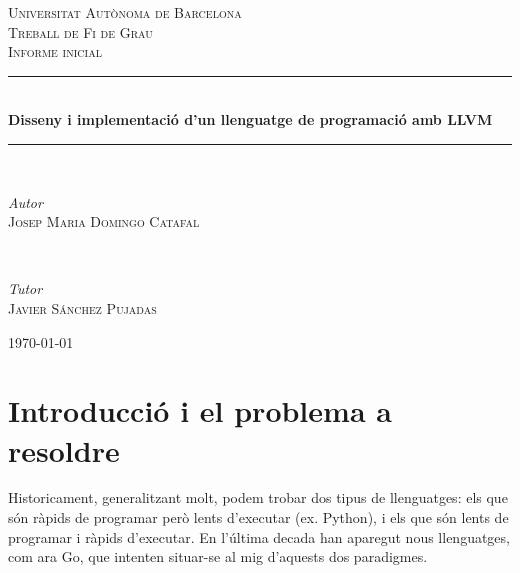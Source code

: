 \documentclass{article}
\begin{document}
\begin{titlepage}
	\newcommand{\HRule}{\rule{\linewidth}{0.4mm}} %
	
	\center

    \vspace*{25px}
	
	\textsc{\LARGE Universitat Autònoma de Barcelona}\\[1.5cm]
	
	\textsc{\Large Treball de Fi de Grau}\\[0.5cm]
	
	\textsc{\Large Informe inicial}\\[0.5cm]
	
	\HRule\\[0.4cm]
	
	{\LARGE\bfseries Disseny i implementació d'un llenguatge de programació amb LLVM}\\[0.4cm]
	
	\HRule\\[1.5cm]
	
	
	\begin{minipage}{0.5\textwidth}
		\begin{flushleft}
			\large
			\textit{Autor}\\
			\textsc{Josep Maria Domingo Catafal}
		\end{flushleft}
	\end{minipage}
	~
	\begin{minipage}{0.4\textwidth}
		\begin{flushright}
			\large
			\textit{Tutor}\\
			\textsc{Javier Sánchez Pujadas}
		\end{flushright}
	\end{minipage}
	

	\vfill\vfill\vfill %
	
	{\large\today} %

	\vfill %
\end{titlepage}

\section{Introducció i el problema a resoldre}
Historicament, generalitzant molt, podem trobar dos tipus de llenguatges: els que 
són ràpids de programar però lents d'executar (ex. Python), i els que són lents 
de programar i ràpids d'executar. En l'última decada han aparegut nous
llenguatges, com ara Go, que intenten situar-se al mig d'aquests dos paradigmes.
\end{document}
